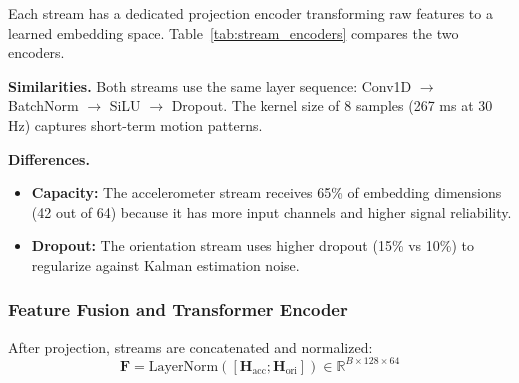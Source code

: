 Each stream has a dedicated projection encoder transforming raw features to a learned embedding space. Table~\ref{tab:stream_encoders} compares the two encoders.

\begin{table}[htbp]
\centering
\caption{Dual-Stream Encoder Comparison}
\label{tab:stream_encoders}
\end{table}

\textbf{Similarities.} Both streams use the same layer sequence: Conv1D $\rightarrow$ BatchNorm $\rightarrow$ SiLU $\rightarrow$ Dropout. The kernel size of 8 samples (267 ms at 30 Hz) captures short-term motion patterns.

\textbf{Differences.}
\begin{itemize}
\item \textbf{Capacity:} The accelerometer stream receives 65\% of embedding dimensions (42 out of 64) because it has more input channels and higher signal reliability.
\item \textbf{Dropout:} The orientation stream uses higher dropout (15\% vs 10\%) to regularize against Kalman estimation noise.
\end{itemize}

\subsubsection{Feature Fusion and Transformer Encoder}

After projection, streams are concatenated and normalized:
\begin{equation}
\mathbf{F} = \text{LayerNorm}([\mathbf{H}_{\text{acc}}; \mathbf{H}_{\text{ori}}]) \in \mathbb{R}^{B \times 128 \times 64}
\label{eq:fusion}
\end{equation}

